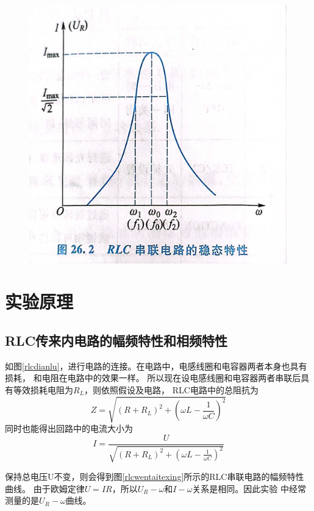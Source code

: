 \documentclass{ctexart}
\begin{document}
\begin{figure}[H]
\begin{minipage}[H]{0.5\textwidth}
  \includegraphics[width=\textwidth]{RLCwentaitexing.jpg}
  \end{minipage}
\end{figure}

\section{实验原理}
  \subsection{RLC传来内电路的幅频特性和相频特性}
  如图\ref{rlcdianlu}，进行电路的连接。在电路中，电感线圈和电容器两者本身也具有损耗，
  和电阻在电路中的效果一样。
  所以现在设电感线圈和电容器两者串联后具有等效损耗电阻为$R_{L}$，则依照假设及电路，
  RLC电路中的总阻抗为
  \begin{equation}\label{rlczongzukang}
    Z=\sqrt{(R+R_{L})^2+(\omega L-\frac{1}{\omega C})^2}
  \end{equation}
  同时也能得出回路中的电流大小为
  \begin{equation}\label{rlcdianliu}
    I=\frac{U}{\sqrt{(R+R_{L})^2+(\omega L-\frac{1}{\omega C})^2}}
  \end{equation}

  保持总电压U不变，则会得到图\ref{rlcwentaitexing}所示的RLC串联电路的幅频特性曲线。
  由于欧姆定律$U=IR$，所以$U_{R}-\omega \mbox{和} I-\omega$关系是相同。因此实验
  中经常测量的是$U_{R}-\omega$曲线。
\end{document}
